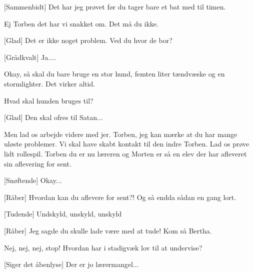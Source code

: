 \documentclass[a4paper,11pt]{article}
\begin{document}
\begin{sketch}
[Sammenbidt] Det har jeg prøvet før du tager bare et bat med til timen.

 Ej Torben det har vi snakket om. Det må du ikke.

[Glad] Det er ikke noget problem. Ved du hvor de bor?

[Grådkvalt] Ja....

 Okay, så skal du bare bruge en stor hund, femten liter tændvæske og en stormlighter. Det virker altid.

 Hvad skal hunden bruges til? 

 [Glad] Den skal ofres til Satan...


 Men lad os arbejde videre med jer. Torben, jeg kan mærke at du har mange uløste problemer. Vi skal have skabt kontakt til den indre Torben. Lad os prøve lidt rollespil. Torben du er nu læreren og Morten er så en elev der har afleveret sin aflevering for sent.

[Snøftende] Okay...

[Råber] Hvordan kan du aflevere for sent?! Og så endda sådan en gang lort.

[Tudende] Undskyld, unskyld, unskyld 

[Råber] Jeg sagde du skulle lade være med at tude!  Kom så Bertha. 

  Nej, nej, nej, stop!  Hvordan har i stadigvæk lov til at undervise?

[Siger det åbenlyse] Der er jo lærermangel...

\end{sketch}
\end{document}
